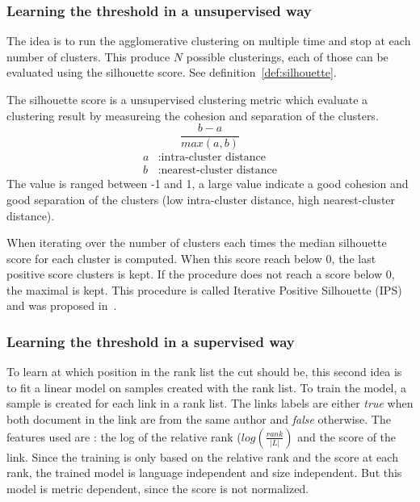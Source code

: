 \subsubsection{Learning the threshold in a unsupervised way}

The idea is to run the agglomerative clustering on multiple time and stop at each number of clusters.
This produce $N$ possible clusterings, each of those can be evaluated using the silhouette score.
See definition~\ref{def:silhouette}.

\begin{definition}
  \label{def:silhouette}
  The silhouette score is a unsupervised clustering metric which evaluate a clustering result by measureing the cohesion and separation of the clusters.
  \begin{equation}
    \frac{b - a}{max(a, b)}
  \end{equation}
  \begin{equation*}
    \begin{split}
      a&: \text{intra-cluster distance}\\
      b&: \text{nearest-cluster distance}
    \end{split}
  \end{equation*}
  The value is ranged between -1 and 1, a large value indicate a good cohesion and good separation of the clusters (low intra-cluster distance, high nearest-cluster distance).
\end{definition}

When iterating over the number of clusters each times the median silhouette score for each cluster is computed.
When this score reach below 0, the last positive score clusters is kept.
If the procedure does not reach a score below 0, the maximal is kept.
This procedure is called Iterative Positive Silhouette (IPS) and was proposed in~\cite{automated_unsupervised}.

\subsubsection{Learning the threshold in a supervised way}

To learn at which position in the rank list the cut should be, this second idea is to fit a linear model on samples created with the rank list.
To train the model, a sample is created for each link in a rank list.
The links labels are either \textit{true} when both document in the link are from the same author and \textit{false} otherwise.
The features used are : the log of the relative rank ($log(\frac{rank}{|L|})$ and the score of the link.
Since the training is only based on the relative rank and the score at each rank, the trained model is language independent and size independent.
But this model is metric dependent, since the score is not normalized.

